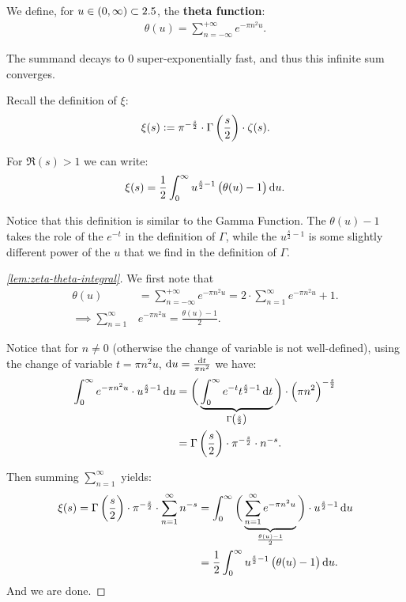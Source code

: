 \begin{definition}
We define, for $u \in (0,\infty) \subset 2.5$, the \textbf{theta function}:
\begin{align*}
    \theta(u) = \sum_{n=-\infty}^{+\infty} e^{- \pi n^2 u}.
\end{align*}
\end{definition}
The summand decays to $0$ super-exponentially fast, and thus this infinite sum converges.

Recall the definition of $\xi$:
\begin{align*}
    \xi(s) \vcentcolon = \pi^{-\frac{s}{2}} \cdot \Gamma\left( \frac{s}{2} \right) \cdot \zeta(s).
\end{align*}

\begin{lemma}\label{lem:zeta-theta-integral}
For $\Re(s) > 1$ we can write:
\begin{align*}
    \xi(s) = \frac{1}{2} \int_0^\infty u^{\frac{s}{2} - 1} \br{\theta(u) - 1} \dif u.
\end{align*}
\end{lemma}

\begin{note}
Notice that this definition is similar to the Gamma Function. The $\theta(u) - 1$ takes the role of the $e^{-t}$ in the definition of $\Gamma$, while the $u^{\frac{s}{2} - 1} $ is some slightly different power of the $u$ that we find in the definition of $\Gamma$.
\end{note}

\begin{proof}[\ref{lem:zeta-theta-integral}]
We first note that
\begin{align*}
    \theta(u) &= \sum_{n=-\infty}^{+\infty} e^{- \pi n^2 u} = 2 \cdot \sum_{n=1 }^{\infty} e^{- \pi n^2 u} + 1.\\
    \implies  \sum_{n=1 }^{\infty}& e^{- \pi n^2 u} = \frac{\theta(u) - 1}{2}.
\end{align*}

Notice that for $n  \neq 0$ (otherwise the change of variable is not well-defined), using the change of variable $t = \pi n^2 u$, $\dif u = \frac{\dif t}{ \pi n^2}$ we have:
\begin{align*}
    \int_0^\infty e^{- \pi n^2 u} \cdot  u^{\frac{s}{2} -1} \dif u &= \bigg( \underbrace{ \int_0^\infty e^{-t} t^{\frac{s}{2} - 1} \dif t}_{\Gamma\br{\frac{s}{2}}} \bigg) \cdot \br{\pi n^2}^{- \frac{s}{2}} \\
    &= \Gamma\br{\frac{s}{2}} \cdot \pi^{- \frac{s}{2}} \cdot n^{-s}.
\end{align*}

Then summing $\sum_{n=1}^\infty$ yields:
\begin{align*}
    \xi(s) = \Gamma\br{\frac{s}{2}} \cdot \pi^{- \frac{s}{2}} \cdot \sum_{n=1}^\infty   n^{-s} &= \int_0^\infty \bigg( \underbrace{ \sum_{n=1}^\infty  e^{- \pi n^2 u} }_{\frac{\theta(u) - 1}{2}}\bigg) \cdot  u^{\frac{s}{2} -1} \dif u\\
    &=\frac{1}{2} \int_0^\infty u^{\frac{s}{2} - 1} \br{\theta(u) - 1} \dif u.
\end{align*}
And we are done.
\end{proof}


